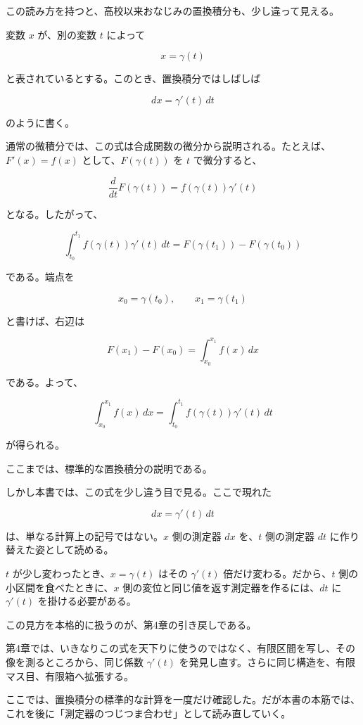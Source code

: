 \documentclass[a4paper,12pt,openany]{book}
\begin{document}
この読み方を持つと、高校以来おなじみの置換積分も、少し違って見える。

変数 \(x\) が、別の変数 \(t\) によって

\[
x=\gamma(t)
\]

と表されているとする。このとき、置換積分ではしばしば

\[
dx=\gamma'(t)\,dt
\]

のように書く。

通常の微積分では、この式は合成関数の微分から説明される。たとえば、\(F'(x)=f(x)\)
として、\(F(\gamma(t))\) を \(t\) で微分すると、

\[
\frac{d}{dt}F(\gamma(t))
=
f(\gamma(t))\gamma'(t)
\]

となる。したがって、

\[
\int_{t_0}^{t_1} f(\gamma(t))\gamma'(t)\,dt
=
F(\gamma(t_1))-F(\gamma(t_0))
\]

である。端点を

\[
x_0=\gamma(t_0),\qquad x_1=\gamma(t_1)
\]

と書けば、右辺は

\[
F(x_1)-F(x_0)
=
\int_{x_0}^{x_1} f(x)\,dx
\]

である。よって、

\[
\int_{x_0}^{x_1} f(x)\,dx
=
\int_{t_0}^{t_1} f(\gamma(t))\gamma'(t)\,dt
\]

が得られる。

ここまでは、標準的な置換積分の説明である。

しかし本書では、この式を少し違う目で見る。ここで現れた

\[
dx=\gamma'(t)\,dt
\]

は、単なる計算上の記号ではない。\(x\) 側の測定器 \(dx\) を、\(t\)
側の測定器 \(dt\) に作り替えた姿として読める。

\(t\) が少し変わったとき、\(x=\gamma(t)\) はその \(\gamma'(t)\)
倍だけ変わる。だから、\(t\) 側の小区間を食べたときに、\(x\)
側の変位と同じ値を返す測定器を作るには、\(dt\) に \(\gamma'(t)\)
を掛ける必要がある。

この見方を本格的に扱うのが、第4章の引き戻しである。

第4章では、いきなりこの式を天下りに使うのではなく、有限区間を写し、その像を測るところから、同じ係数
\(\gamma'(t)\)
を発見し直す。さらに同じ構造を、有限マス目、有限箱へ拡張する。

ここでは、置換積分の標準的な計算を一度だけ確認した。だが本書の本筋では、これを後に「測定器のつじつま合わせ」として読み直していく。
\end{document}
